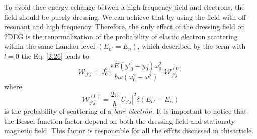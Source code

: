 \noindent
To avoid thee energy echange betwen a high-frequency field and electrons, the field should be purely dressing. We can achieve that by using the field with off-resonant and high frequency. Therefore, the only effect of the dressing field on 2DEG is the renormalization of the probability of elastic electron scattering within the same Landau level $(E_{n'}=E_n)$, which described by the term with $l=0$ the Eq. \eqref{2.26} leads to
\begin{equation} \label{2.27}
    \mathcal{W}_{j'j} = J_0^2\bigg[\frac{eE({y'}_0 - y_0)\omega_0^2}{\hbar\omega(\omega_0^2-\omega^2)}\bigg]
    \mathcal{W}_{j'j}^{(0)}
\end{equation}
where
\begin{equation} \label{2.28}
    \mathcal{W}_{j'j}^{(0)} = \frac{2\pi}{\hbar} |U_{j'j}|^2
    \delta(E_{n'} - E_{n})
\end{equation}
is the probability of scattering of a \textit{bare electron}. It is important to notice that the Bessel function factor depend on both the dressing field and stationaty magnetic field. This factor is responcible for all the effcts discussed in thisarticle.

